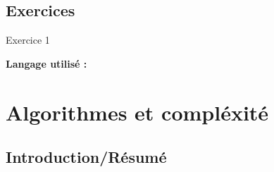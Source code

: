 \subsection{Exercices}

\begin{Exercice}[Durée] Exercice 1\\

\begin{conseil}
\end{conseil}
    
\begin{solution}
\textbf{Langage utilisé :}
    
\end{solution}

\end{Exercice}

\section{Algorithmes et compléxité}

\subsection{Introduction/Résumé}

